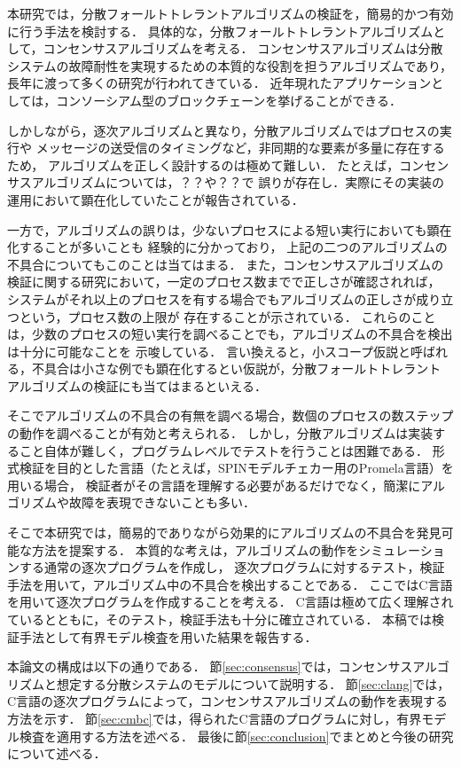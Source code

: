 \documentclass[technicalreport]{ieicej}
\theoremstyle{plain}
\begin{document}
本研究では，分散フォールトトレラントアルゴリズムの検証を，簡易的かつ有効に行う手法を検討する．
具体的な，分散フォールトトレラントアルゴリズムとして，コンセンサスアルゴリズムを考える．
コンセンサスアルゴリズムは分散システムの故障耐性を実現するための本質的な役割を担うアルゴリズムであり，
長年に渡って多くの研究が行われてきている．
近年現れたアプリケーションとしては，コンソーシアム型のブロックチェーンを挙げることができる．

しかしながら，逐次アルゴリズムと異なり，分散アルゴリズムではプロセスの実行や
メッセージの送受信のタイミングなど，非同期的な要素が多量に存在するため，
アルゴリズムを正しく設計するのは極めて難しい．
たとえば，コンセンサスアルゴリズムについては，？？や？？で
誤りが存在し．実際にその実装の運用において顕在化していたことが報告されている．

一方で，アルゴリズムの誤りは，少ないプロセスによる短い実行においても顕在化することが多いことも
経験的に分かっており，
上記の二つのアルゴリズムの不具合についてもこのことは当てはまる．
また，コンセンサスアルゴリズムの検証に関する研究において，一定のプロセス数までで正しさが確認されれば，
システムがそれ以上のプロセスを有する場合でもアルゴリズムの正しさが成り立つという，プロセス数の上限が
存在することが示されている．
これらのことは，少数のプロセスの短い実行を調べることでも，アルゴリズムの不具合を検出は十分に可能なことを
示唆している．
言い換えると，小スコープ仮説と呼ばれる，不具合は小さな例でも顕在化するとい仮説が，分散フォールトトレラント
アルゴリズムの検証にも当てはまるといえる．

そこでアルゴリズムの不具合の有無を調べる場合，数個のプロセスの数ステップの動作を調べることが有効と考えられる．
しかし，分散アルゴリズムは実装すること自体が難しく，プログラムレベルでテストを行うことは困難である．
形式検証を目的とした言語（たとえば，SPINモデルチェカー用のPromela言語）を用いる場合，
検証者がその言語を理解する必要があるだけでなく，簡潔にアルゴリズムや故障を表現できないことも多い．

そこで本研究では，簡易的でありながら効果的にアルゴリズムの不具合を発見可能な方法を提案する．
本質的な考えは，アルゴリズムの動作をシミュレーションする通常の逐次プログラムを作成し，
逐次プログラムに対するテスト，検証手法を用いて，アルゴリズム中の不具合を検出することである．
ここではC言語を用いて逐次プログラムを作成することを考える．
C言語は極めて広く理解されているとともに，そのテスト，検証手法も十分に確立されている．
本稿では検証手法として有界モデル検査を用いた結果を報告する．

本論文の構成は以下の通りである．
節\ref{sec:consensus}では，コンセンサスアルゴリズムと想定する分散システムのモデルについて説明する．
節\ref{sec:clang}では，C言語の逐次プログラムによって，コンセンサスアルゴリズムの動作を表現する方法を示す．
節\ref{sec:cmbc}では，得られたC言語のプログラムに対し，有界モデル検査を適用する方法を述べる．
最後に節\ref{sec:conclusion}でまとめと今後の研究について述べる．
\end{document}
